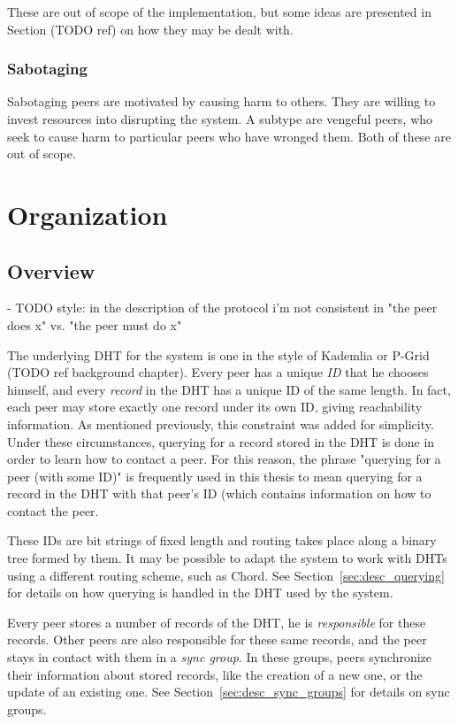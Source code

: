 These are out of scope of the implementation, but some ideas are presented in
Section (TODO ref) on how they may be dealt with.

\subsubsection{Sabotaging}
Sabotaging peers are motivated by causing harm to others. They are willing to
invest resources into disrupting the system. A subtype are vengeful peers, who
seek to cause harm to particular peers who have wronged them. Both of these are
out of scope.

\section{Organization}
\subsection{Overview}
- TODO style: in the description of the protocol i'm not consistent in "the peer
  does x" vs. "the peer must do x"

The underlying \ac{DHT} for the system is one in the style of Kademlia or P-Grid
(TODO ref background chapter). Every peer has a unique \emph{ID} that he chooses
himself, and every \emph{record} in the \ac{DHT} has a unique ID of the same
length. In fact, each peer may store exactly one record under its own ID, giving
reachability information. As mentioned previously, this constraint was added for
simplicity. Under these circumstances, querying for a record stored in the
\ac{DHT} is done in order to learn how to contact a peer. For this reason, the
phrase "querying for a peer (with some ID)" is frequently used in this thesis to
mean querying for a record in the \ac{DHT} with that peer's ID (which contains
information on how to contact the peer.

These IDs are bit strings of fixed length and routing takes place
along a binary tree formed by them. It may be possible to adapt the system to
work with \acp{DHT} using a different routing scheme, such as Chord. See
Section~\ref{sec:desc_querying} for details on how querying is handled in the
\ac{DHT} used by the system.

Every peer stores a number of records of the \ac{DHT}, he is \emph{responsible}
for these records. Other peers are also responsible for these same records, and
the peer stays in contact with them in a \emph{sync group}. In these groups,
peers synchronize their information about stored records, like the creation of a
new one, or the update of an existing one. See
Section~\ref{sec:desc_sync_groups} for details on sync groups.

